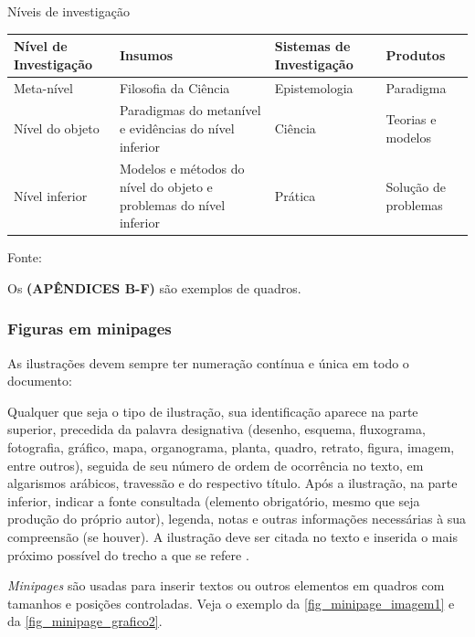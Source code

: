 \begin{quadro}[htb]
	\caption{\label{quadro_modelo}Níveis de investigação}
	\begin{tabular}{|p{2.6cm}|p{6.0cm}|p{2.25cm}|p{3.40cm}|}
		\hline
		\textbf{Nível de Investigação} & \textbf{Insumos}  & \textbf{Sistemas de Investigação}  & \textbf{Produtos}  \\
		\hline
		Meta-nível & Filosofia\index{filosofia} da Ciência  & Epistemologia &
		Paradigma  \\
		\hline
		Nível do objeto & Paradigmas do metanível e evidências do nível inferior &
		Ciência  & Teorias e modelos \\
		\hline
		Nível inferior & Modelos e métodos do nível do objeto e problemas do nível inferior & Prática & Solução de problemas  \\
		\hline
	\end{tabular}
	\begin{flushleft}
		Fonte: \citeonline{van1986}
	\end{flushleft}
\end{quadro} 


Os \textbf{(APÊNDICES B-F)} são exemplos de quadros.

\subsubsection{Figuras em minipages}

As ilustrações devem sempre ter numeração contínua e única em todo o documento:


\begin{citacao}
	Qualquer que seja o tipo de ilustração, sua identificação aparece na parte
	superior, precedida da palavra designativa (desenho, esquema, fluxograma,
	fotografia, gráfico, mapa, organograma, planta, quadro, retrato, figura,
	imagem, entre outros), seguida de seu número de ordem de ocorrência no texto,
	em algarismos arábicos, travessão e do respectivo título. Após a ilustração, na
	parte inferior, indicar a fonte consultada (elemento obrigatório, mesmo que
	seja produção do próprio autor), legenda, notas e outras informações
	necessárias à sua compreensão (se houver). A ilustração deve ser citada no
	texto e inserida o mais próximo possível do trecho a que se
	refere \cite{nbr14724}.
\end{citacao}

\emph{Minipages} são usadas para inserir textos ou outros elementos em quadros
com tamanhos e posições controladas. Veja o exemplo da
\autoref{fig_minipage_imagem1} e da \autoref{fig_minipage_grafico2}.

